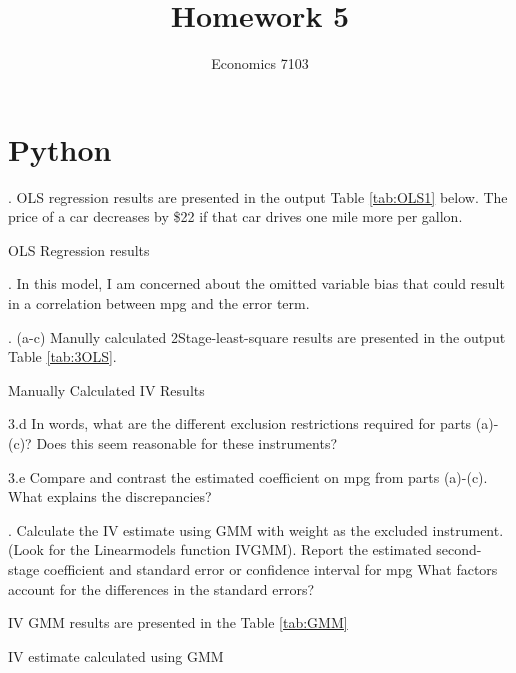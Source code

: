 \documentclass{article}
\title{Homework 5}
\author{Economics 7103}
\begin{document}
  
\maketitle

\section{Python}
. OLS regression results are presented in the output Table \ref{tab:OLS1} below. The price of a car decreases by \$22 if that car drives one mile more per gallon. 

\begin{table}[h]
    \centering
    
    \caption{OLS Regression results}
    \label{tab:OLS1}
\end{table}

. In this model, I am concerned about the omitted variable bias that could result in a correlation between mpg and the error term.

\clearpage

. (a-c) Manully calculated 2Stage-least-square results are presented in the output Table \ref{tab:3OLS}. 

\begin{table}[h]
    \centering
    
    \caption{Manually Calculated IV Results}
    \label{tab:3OLS}
\end{table}

\noindent 3.d In words, what are the different exclusion restrictions required for parts (a)-(c)? Does this seem reasonable for these instruments?


\noindent 3.e Compare and contrast the estimated coefficient on mpg from parts (a)-(c). What explains the discrepancies?

. Calculate the IV estimate using GMM with weight as the excluded instrument. (Look for the Linearmodels function IVGMM). Report the estimated second-stage coefficient and standard error or confidence interval for mpg What factors account for the differences in the standard errors?

IV GMM results are presented in the Table \ref{tab:GMM}

\begin{table}[h]
    \centering
    
    \caption{IV estimate calculated using GMM}
    \label{tab:GMM}
\end{table}
\end{document}
